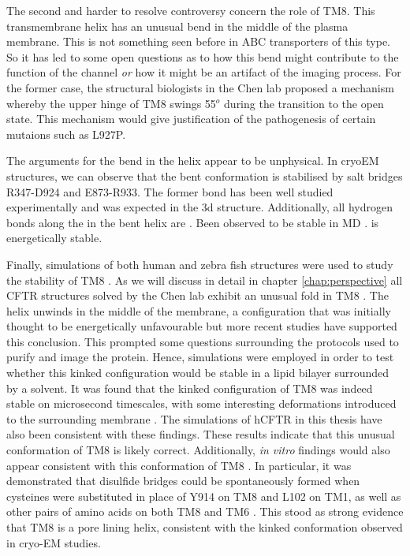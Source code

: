 The second and harder to resolve controversy concern the role of TM8. This transmembrane helix has an unusual bend in the middle of the plasma membrane. This is not something seen before in ABC transporters of this type. So it has led to some open questions as to how this bend might contribute to the function of the channel \textit{or} how it might be an artifact of the imaging process. For the former case, the structural biologists in the Chen lab proposed a mechanism whereby the upper hinge of TM8 swings 55$^o$ during the transition to the open state. This mechanism would give justification of the pathogenesis of certain mutaions such as L927P. 

The arguments for the bend in the helix appear to be unphysical. In cryoEM structures, we can observe that the bent conformation is stabilised by salt bridges R347-D924 and E873-R933. The former bond has been well studied experimentally and was expected in the 3d structure. Additionally, all hydrogen bonds along the in the bent helix are . Been observed to be stable in MD \cite{corradi2018} .  is energetically stable.

Finally, simulations of both human and zebra fish structures were used to study the stability of TM8 \cite{corradi2018}. As we will discuss in detail in chapter \ref{chap:perspective} all CFTR structures solved by the Chen lab exhibit an unusual fold in TM8 \cite{fiedorczuk2021, liu2017, liu2019, zhang2016, zhang2018a, zhang2017a}. The helix unwinds in the middle of the membrane, a configuration that was initially thought to be energetically unfavourable but more recent studies have supported this conclusion. This prompted some questions surrounding the protocols used to purify and image the protein. Hence, simulations were employed in order to test whether this kinked configuration would be stable in a lipid bilayer surrounded by a solvent. It was found that the kinked configuration of TM8 was indeed stable on microsecond timescales, with some interesting deformations introduced to the surrounding membrane \cite{corradi2018}. The simulations of hCFTR in this thesis have also been consistent with these findings. These results indicate that this unusual conformation of TM8 is likely correct. Additionally, \textit{in vitro} findings would also appear consistent with this conformation of TM8 \cite{infield2021}. In particular, it was demonstrated that disulfide bridges could be  spontaneously formed when cysteines were substituted in place of Y914 on TM8 and L102 on TM1, as well as other pairs of amino acids on both TM8 and TM6 \cite{negoda2019}. This stood as strong evidence that TM8 is a pore lining helix, consistent with the kinked conformation observed in cryo-EM studies.

